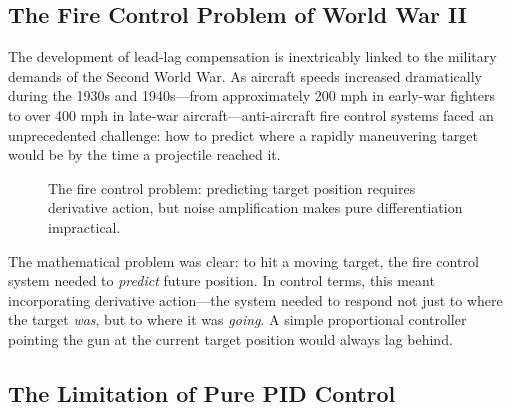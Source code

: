 \subsection{The Fire Control Problem of World War II}

The development of lead-lag compensation is inextricably linked to the military demands of the Second World War. As aircraft speeds increased dramatically during the 1930s and 1940s---from approximately 200 mph in early-war fighters to over 400 mph in late-war aircraft---anti-aircraft fire control systems faced an unprecedented challenge: how to predict where a rapidly maneuvering target would be by the time a projectile reached it.

\begin{figure}[htbp]
\centering
{}
\caption{The fire control problem: predicting target position requires derivative action, but noise amplification makes pure differentiation impractical.}
\label{fig:fire_control_problem}
\end{figure}

The mathematical problem was clear: to hit a moving target, the fire control system needed to \textit{predict} future position. In control terms, this meant incorporating derivative action---the system needed to respond not just to where the target \textit{was}, but to where it was \textit{going}. A simple proportional controller pointing the gun at the current target position would always lag behind.

\subsection{The Limitation of Pure PID Control}

